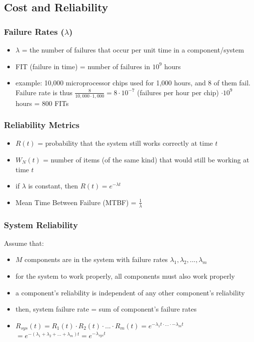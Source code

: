\documentclass[12pt]{extarticle}
\begin{document}
	\subsection{Cost and Reliability}

	\subsubsection{Failure Rates ($\lambda$)}

	\begin{itemize}
		\item $\lambda$ = the number of failures that occur per unit time in a component/system
		\item FIT (failure in time) = number of failures in $10^9$ hours
		\item example: 10,000 microprocessor chips used for 1,000 hours, and 8 of them fail. Failure rate is thus 
		$\frac{8}{10,000 \cdot 1,000} = 8 \cdot 10^{-7}$ (failures per hour per chip) $\cdot 10^9$ hours = 800 FITs
	\end{itemize}

	\subsubsection{Reliability Metrics}

	\begin{itemize}
		\item $R(t)$ = probability that the system still works correctly at time $t$
		\item $W_N(t)$ = number of items (of the same kind) that would still be working at time $t$
		\item if $\lambda$ is constant, then $R(t) = e^{-\lambda t}$
		\item Mean Time Between Failure (MTBF) = $\frac{1}{\lambda}$
	\end{itemize}

	\subsubsection{System Reliability}

	Assume that:

	\begin{itemize}
		\item $M$ components are in the system with failure rates $\lambda_1, \lambda_2, ..., \lambda_m$
		\item for the system to work properly, all components must also work properly
		\item a component's reliability is independent of any other component's reliability
		\item then, system failure rate = sum of component's failure rates
		\item $R_{sys}(t) = R_1(t) \cdot R_2(t) \cdot ... \cdot R_m(t) = e^{-\lambda_1 t \cdot ... \cdot -\lambda_mt}$
		$= e^{-(\lambda_1 + \lambda_2 + ... + \lambda_m)t} = e^{-\lambda_{sys}t}$
	\end{itemize}
\end{document}
